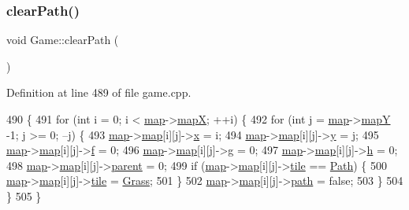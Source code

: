 \subsubsection{\texorpdfstring{clear\+Path()}{clearPath()}}
{\footnotesize\ttfamily void Game\+::clear\+Path (\begin{DoxyParamCaption}{ }\end{DoxyParamCaption})}



Definition at line 489 of file game.\+cpp.


\begin{DoxyCode}
490 \{
491     \textcolor{keywordflow}{for} (\textcolor{keywordtype}{int} i = 0; i < \hyperlink{class_game_acef3a39fdf14be2c980b0dc11e7be402}{map}->\hyperlink{class_map_acfd20721da29a2e353598555e23e12f0}{mapX}; ++i) \{
492         \textcolor{keywordflow}{for} (\textcolor{keywordtype}{int} j = \hyperlink{class_game_acef3a39fdf14be2c980b0dc11e7be402}{map}->\hyperlink{class_map_ae08efae9ac1453b2690985c627aca358}{mapY} -1; j >= 0; --j) \{
493             \hyperlink{class_game_acef3a39fdf14be2c980b0dc11e7be402}{map}->\hyperlink{class_map_a7298e7a7b5dbdc642c49ded9a2c754a5}{map}[i][j]->\hyperlink{class_node_aff1029a518bdc2651007b8856f958364}{x} = i;
494             \hyperlink{class_game_acef3a39fdf14be2c980b0dc11e7be402}{map}->\hyperlink{class_map_a7298e7a7b5dbdc642c49ded9a2c754a5}{map}[i][j]->\hyperlink{class_node_aa3e5b5240023b4528ae85057b3324202}{y} = j;
495             \hyperlink{class_game_acef3a39fdf14be2c980b0dc11e7be402}{map}->\hyperlink{class_map_a7298e7a7b5dbdc642c49ded9a2c754a5}{map}[i][j]->\hyperlink{class_node_a32fbe9e0f4fc9e9d1845ce808738d7ab}{f} = 0;
496             \hyperlink{class_game_acef3a39fdf14be2c980b0dc11e7be402}{map}->\hyperlink{class_map_a7298e7a7b5dbdc642c49ded9a2c754a5}{map}[i][j]->\hyperlink{class_node_a0b249888eacdec6c623ec8c58b230c48}{g} = 0;
497             \hyperlink{class_game_acef3a39fdf14be2c980b0dc11e7be402}{map}->\hyperlink{class_map_a7298e7a7b5dbdc642c49ded9a2c754a5}{map}[i][j]->\hyperlink{class_node_afb5a7ac7536a9e09488bb685420cd78a}{h} = 0;
498             \hyperlink{class_game_acef3a39fdf14be2c980b0dc11e7be402}{map}->\hyperlink{class_map_a7298e7a7b5dbdc642c49ded9a2c754a5}{map}[i][j]->\hyperlink{class_node_ad8184598cdea70e4bbdfd76f2b0f9e85}{parent} = 0;
499             \textcolor{keywordflow}{if} (\hyperlink{class_game_acef3a39fdf14be2c980b0dc11e7be402}{map}->\hyperlink{class_map_a7298e7a7b5dbdc642c49ded9a2c754a5}{map}[i][j]->\hyperlink{class_node_a2250e2c1710fb19f15f236ac69563613}{tile} == \hyperlink{node_8h_ac9e486ec80ccfdb28a4f4837d419c9f1a064af96be640396afe6970cc3cffba4c}{Path}) \{
500                 \hyperlink{class_game_acef3a39fdf14be2c980b0dc11e7be402}{map}->\hyperlink{class_map_a7298e7a7b5dbdc642c49ded9a2c754a5}{map}[i][j]->\hyperlink{class_node_a2250e2c1710fb19f15f236ac69563613}{tile} = \hyperlink{node_8h_ac9e486ec80ccfdb28a4f4837d419c9f1a283b79b5e51a79e202e0702f189485ad}{Grass};
501             \}
502             \hyperlink{class_game_acef3a39fdf14be2c980b0dc11e7be402}{map}->\hyperlink{class_map_a7298e7a7b5dbdc642c49ded9a2c754a5}{map}[i][j]->\hyperlink{class_node_a2bb1959485873369ea2504c1dece3f33}{path} = \textcolor{keyword}{false};
503         \}
504     \}
505 \}
\end{DoxyCode}
